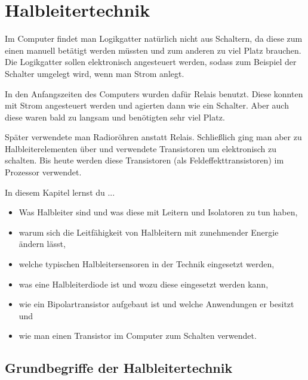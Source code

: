 
\chapter{Halbleitertechnik}

Im Computer findet man Logikgatter natürlich nicht aus Schaltern, da diese zum einen manuell betätigt werden müssten und zum anderen zu viel Platz brauchen.
Die Logikgatter sollen elektronisch angesteuert werden, sodass zum Beispiel der Schalter umgelegt wird, wenn man Strom anlegt.

In den Anfangszeiten des Computers wurden dafür Relais benutzt.
Diese konnten mit Strom angesteuert werden und agierten dann wie ein Schalter.
Aber auch diese waren bald zu langsam und benötigten sehr viel Platz.

Später verwendete man Radioröhren anstatt Relais.
Schließlich ging man aber zu Halbleiterelementen über und verwendete Transistoren um elektronisch zu schalten.
Bis heute werden diese Transistoren (als Feldeffekttransistoren) im Prozessor verwendet.


\begin{Ziele}
In diesem Kapitel lernst du ...
\begin{itemize}
\item Was Halbleiter sind und was diese mit Leitern und Isolatoren zu tun haben,
\item warum sich die Leitfähigkeit von Halbleitern mit zunehmender Energie ändern lässt,
\item welche typischen Halbleitersensoren in der Technik eingesetzt werden,
\item was eine Halbleiterdiode ist und wozu diese eingesetzt werden kann,
\item wie ein Bipolartransistor aufgebaut ist und welche Anwendungen er besitzt und
\item wie man einen Transistor im Computer zum Schalten verwendet.
\end{itemize}
\end{Ziele}

\section{Grundbegriffe der Halbleitertechnik}

